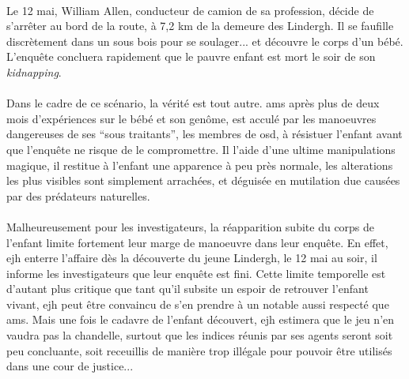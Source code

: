 \paragraph{} Le 12 mai, William Allen, conducteur de camion de sa profession, décide de s'arrêter au bord de la route, à 7,2 km de la demeure des Lindergh. Il
se faufille discrètement dans un sous bois pour se soulager... et découvre le corps d'un bébé. L'enquête concluera rapidement que le pauvre enfant est mort le
soir de son \emph{kidnapping}. 
\paragraph{} Dans le cadre de ce scénario, la vérité est tout autre. \gls{ams} après plus de deux mois d'expériences sur le bébé et son genôme, est acculé par les manoeuvres dangereuses de ses ``sous traitants'', les membres de \gls{osd}, à résistuer l'enfant avant que l'enquête ne risque de le compromettre. Il 
l'aide d'une ultime manipulations magique, il restitue à l'enfant une apparence à peu près normale, les alterations les plus visibles sont simplement arrachées,
et déguisée en mutilation due causées par des prédateurs naturelles.
\paragraph{} Malheureusement pour les investigateurs, la réapparition subite du corps de l'enfant limite fortement leur marge de manoeuvre dans leur enquête. En effet, \gls{ejh} enterre l'affaire dès la découverte du jeune Lindergh, le 12 mai au soir, il informe les investigateurs que leur enquête est fini. Cette limite temporelle est d'autant plus critique que tant qu'il subsite un espoir de retrouver l'enfant vivant, \gls{ejh} peut être convaincu de s'en prendre à un 
notable aussi respecté que \gls{ams}. Mais une fois le cadavre de l'enfant découvert, \gls{ejh} estimera que le jeu n'en vaudra pas la chandelle, surtout que
les indices réunis par ses agents seront soit peu concluante, soit receuillis de manière trop illégale pour pouvoir être utilisés dans une cour de justice...

